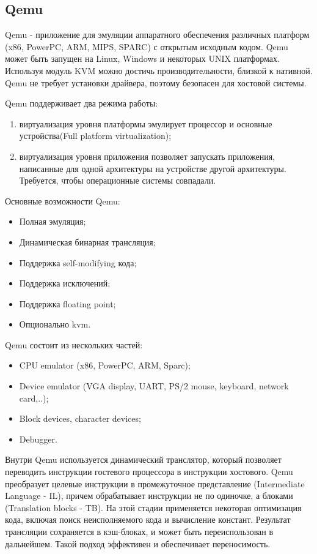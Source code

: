 \subsection{Qemu}
Qemu - приложение для эмуляции аппаратного обеспечения различных платформ (x86, PowerPC, ARM, MIPS, SPARC) с открытым исходным кодом. Qemu может быть запущен на Linux, Windows и некоторых UNIX платформах. Используя модуль KVM можно достичь производительности, близкой к нативной. Qemu не требует установки драйвера, поэтому безопасен для хостовой системы.

Qemu поддерживает два режима работы:

\begin{enumerate}
    \item виртуализация уровня платформы эмулирует процессор и основные устройства(Full platform virtualization);
    \item виртуализация уровня приложения позволяет запускать приложения, написанные для одной архитектуры на устройстве другой архитектуры. Требуется, чтобы операционные системы совпадали.
\end{enumerate}

Основные возможности Qemu:
\begin{itemize}
    \item Полная эмуляция;
    \item Динамическая бинарная трансляция;
    \item Поддержка self-modifying кода;
    \item Поддержка исключений;
    \item Поддержка floating point;
    \item Опционально kvm.
\end{itemize}

Qemu состоит из нескольких частей:
\begin{itemize}
    \item CPU emulator (x86, PowerPC, ARM, Sparc);
    \item Device emulator (VGA display, UART, PS/2 mouse, keyboard, network card,..);
    \item Block devices, character devices;
    \item Debugger.
\end{itemize}

Внутри Qemu используется динамический транслятор, который позволяет переводить инструкции гостевого процессора в инструкции хостового. Qemu преобразует целевые инструкции в промежуточное представление (Intermediate Language - IL), причем обрабатывает инструкции не по одиночке, а блоками (Translation blocks - TB). На этой стадии применяется некоторая оптимизация кода, включая поиск неисполняемого кода и вычисление констант. Результат трансляции сохраняется в кэш-блоках, и может быть переиспользован в дальнейшем. Такой подход эффективен и обеспечивает переносимость.

